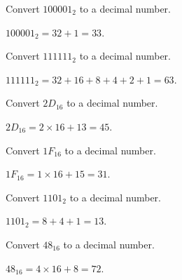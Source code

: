 

\question[5]
Convert \(100001_{2}\) to a decimal number.
\begin{choices}
\end{choices}
\begin{solution}
  \(100001_{2} = 32 + 1 = 33\).
\end{solution}

\question[5]
Convert \(111111_{2}\) to a decimal number.
\begin{choices}
\end{choices}
\begin{solution}
  \(111111_{2} = 32 + 16 + 8 + 4 + 2 + 1 = 63\).
\end{solution}

\question[5]
Convert \(2D_{16}\) to a decimal number.
\begin{choices}
\end{choices}
\begin{solution}
  \(2D_{16} = 2 \times 16 + 13 = 45\).
\end{solution}

\question[5]
Convert \(1F_{16}\) to a decimal number.
\begin{choices}
\end{choices}
\begin{solution}
  \(1F_{16} = 1 \times 16 + 15 = 31\).
\end{solution}

\newpage 

\question[5]
Convert \(1101_{2}\) to a decimal number.
\begin{choices}
\end{choices}
\begin{solution}
  \(1101_{2} = 8 + 4 + 1 = 13\).
\end{solution}

\question[5]
Convert \(48_{16}\) to a decimal number.
\begin{choices}
\end{choices}
\begin{solution}
  \(48_{16} = 4 \times 16 + 8 = 72\).
\end{solution}

